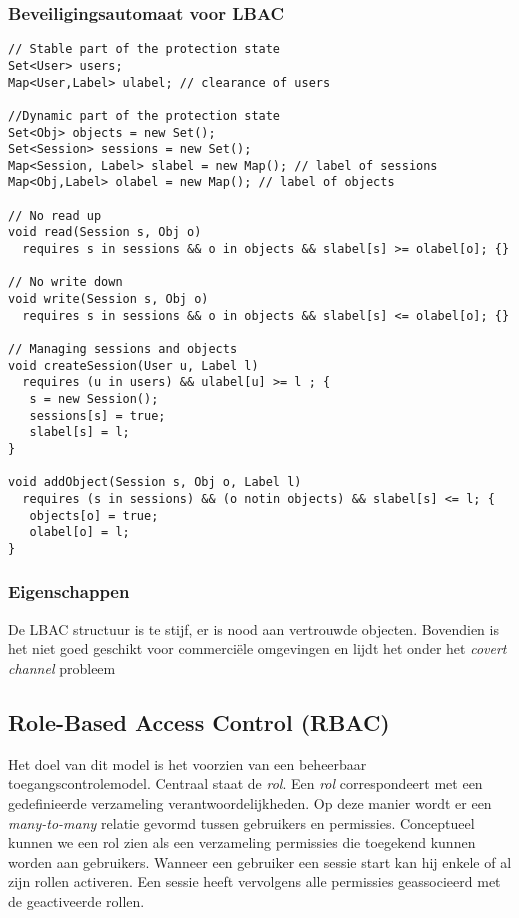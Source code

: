 \documentclass[../main.tex]{subfiles}
\begin{document}
\subsubsection{Beveiligingsautomaat voor LBAC}
\begin{lstlisting}[caption=LBAC Automaat]
// Stable part of the protection state
Set<User> users;
Map<User,Label> ulabel; // clearance of users

//Dynamic part of the protection state
Set<Obj> objects = new Set();
Set<Session> sessions = new Set();
Map<Session, Label> slabel = new Map(); // label of sessions
Map<Obj,Label> olabel = new Map(); // label of objects

// No read up
void read(Session s, Obj o)
  requires s in sessions && o in objects && slabel[s] >= olabel[o]; {}

// No write down
void write(Session s, Obj o)
  requires s in sessions && o in objects && slabel[s] <= olabel[o]; {}

// Managing sessions and objects
void createSession(User u, Label l)
  requires (u in users) && ulabel[u] >= l ; {
   s = new Session();
   sessions[s] = true;
   slabel[s] = l;
}

void addObject(Session s, Obj o, Label l)
  requires (s in sessions) && (o notin objects) && slabel[s] <= l; {
   objects[o] = true;
   olabel[o] = l;
}
\end{lstlisting}

\subsubsection{Eigenschappen}
De LBAC structuur is te stijf, er is nood aan vertrouwde objecten. Bovendien is het niet goed geschikt voor commerci\"ele omgevingen en lijdt het onder het \textit{covert channel} probleem

\subsection{Role-Based Access Control (RBAC)}
Het doel van dit model is het voorzien van een beheerbaar toegangscontrolemodel. Centraal staat de \textit{rol}. Een \textit{rol} correspondeert met een gedefinieerde verzameling verantwoordelijkheden. Op deze manier wordt er een \textit{many-to-many} relatie gevormd tussen gebruikers en permissies. Conceptueel kunnen we een rol zien als een verzameling permissies die toegekend kunnen worden aan gebruikers. Wanneer een gebruiker een sessie start kan hij enkele of al zijn rollen activeren. Een sessie heeft vervolgens alle permissies geassocieerd met de geactiveerde rollen.
\end{document}
